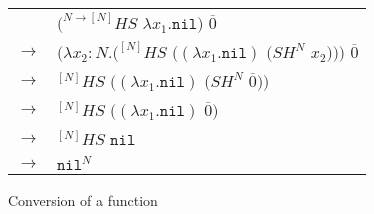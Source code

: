 \begin{figure}[tb]
\centering
\begin{tabular}{ll}
\vspace{5pt}

& $(^{N\rightarrow[N]}HS$ $\lambda x_{1}.\mathtt{nil})$ $\overline{0}$ \\

\vspace{5pt}

$\rightarrow$ & $(\lambda x_{2}:N.(^{[N]}HS$ $((\lambda x_{1}.\mathtt{nil})$ $(SH^{N}$ $x_{2})))$ $\overline{0}$ \\

\vspace{5pt}

$\rightarrow$ & $^{[N]}HS$ $((\lambda x_{1}.\mathtt{nil})$ $(SH^{N}$ $\overline{0}))$ \\

\vspace{5pt}

$\rightarrow$ & $^{[N]}HS$ $((\lambda x_{1}.\mathtt{nil})$ $\overline{0})$ \\

\vspace{5pt}

$\rightarrow$ & $^{[N]}HS$ $\mathtt{nil}$ \\

\vspace{5pt}

$\rightarrow$ & $\mathtt{nil}^{N}$
\end{tabular}
\caption{Conversion of a function}
\label{function-1}
\end{figure}